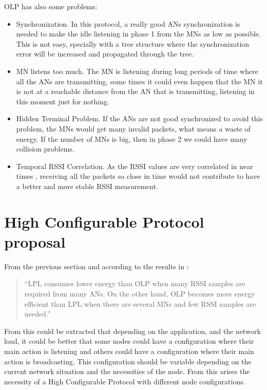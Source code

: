\ac{OLP} has also some problems:

\begin{itemize}
 \item Synchronization. In this protocol, a really good \acp{AN} synchronization is needed to make the idle listening in phase 1 from the 
\acp{MN} as low as possible. This is not easy, specially with a tree structure where the synchronization error will be increased and 
propagated through the tree.
 \item \ac{MN} listens too much. The \ac{MN} is listening during long periods of time where all the \acp{AN} are transmitting, some times it
could even happen that the \ac{MN} it is not at a reachable distance from the \ac{AN} that is transmitting, listening in this moment just 
for nothing.
 \item Hidden Terminal Problem. If the \acp{AN} are not good synchronized to avoid this problem, the \acp{MN} would get many invalid 
packets, what means a waste of energy. If the number of \acp{MN} is big, then in phase 2 we could have many collision problems.
 \item Temporal \ac{RSSI} Correlation. As the \ac{RSSI} values are very correlated in near times \cite{RSSIcorrelated}, receiving all 
the packets so close in time would not contribute to have a better and more stable \ac{RSSI} measurement.
\end{itemize}
 

\section{High Configurable Protocol proposal}
\label{sec:ProtocolDescription}

From the previous section and according to the results in \cite{LPLandOLP}:
\begin{quote}
``LPL consumes lower energy than OLP when many RSSI samples are required from many ANs. On the other hand,
OLP becomes more energy efficient than LPL when there are several MNs and few RSSI samples are needed.''\cite{LPLandOLP}
\end{quote}

From this could be extracted that depending on the application, and the network load, it could be better that some nodes could have a 
configuration where their main action is listening and others could have a configuration where their main action is broadcasting. This 
configuration should be variable depending on the current network situation and the necessities of the node. From this arises the necessity
of a High Configurable Protocol with different node configurations.

